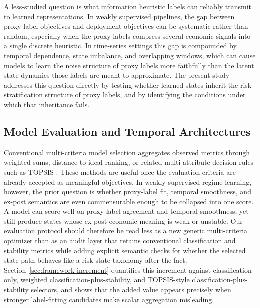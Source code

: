 \documentclass[a4paper,fleqn]{cas-dc}
\begin{document}
A less-studied question is what information heuristic labels can reliably transmit to learned representations. In weakly supervised pipelines, the gap between proxy-label objectives and deployment objectives can be systematic rather than random, especially when the proxy labels compress several economic signals into a single discrete heuristic. In time-series settings this gap is compounded by temporal dependence, state imbalance, and overlapping windows, which can cause models to learn the noise structure of proxy labels more faithfully than the latent state dynamics those labels are meant to approximate. The present study addresses this question directly by testing whether learned states inherit the risk-stratification structure of proxy labels, and by identifying the conditions under which that inheritance fails.

\subsection{Model Evaluation and Temporal Architectures}
Conventional multi-criteria model selection aggregates observed metrics through weighted sums, distance-to-ideal ranking, or related multi-attribute decision rules such as TOPSIS \cite{hwang1981madm}. These methods are useful once the evaluation criteria are already accepted as meaningful objectives. In weakly supervised regime learning, however, the prior question is whether proxy-label fit, temporal smoothness, and ex-post semantics are even commensurable enough to be collapsed into one score. A model can score well on proxy-label agreement and temporal smoothness, yet still produce states whose ex-post economic meaning is weak or unstable. Our evaluation protocol should therefore be read less as a new generic multi-criteria optimizer than as an audit layer that retains conventional classification and stability metrics while adding explicit semantic checks for whether the selected state path behaves like a risk-state taxonomy after the fact. Section~\ref{sec:framework-increment} quantifies this increment against classification-only, weighted classification-plus-stability, and TOPSIS-style classification-plus-stability selectors, and shows that the added value appears precisely when stronger label-fitting candidates make scalar aggregation misleading.
\end{document}
